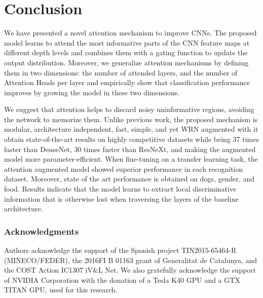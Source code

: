 \documentclass[runningheads]{llncs}
\begin{document}
\section{Conclusion}
We have presented a novel attention mechanism to improve CNNs. The proposed model learns to attend the most informative parts of the CNN feature maps at different depth levels and combines them with a gating function to update the output distribution. Moreover, we generalize attention mechanisms by defining them in two dimensions: the number of attended layers, and the number of Attention Heads per layer and empirically show that classification performance improves by growing the model in these two dimensions. 

We suggest that attention helps to discard noisy uninformative regions, avoiding the network to memorize them. Unlike previous work, the proposed mechanism is modular, architecture independent, fast, simple, and yet WRN augmented with it obtain state-of-the-art results on highly competitive datasets while being 37 times faster than DenseNet, 30 times faster than ResNeXt, and making the augmented model more parameter-efficient. When fine-tuning on a transfer learning task, the attention augmented model showed superior performance in each recognition dataset. Moreover, state of the art performance is obtained on dogs, gender, and food. Results indicate that the model learns to extract local discriminative information that is otherwise lost when traversing the layers of the baseline architecture.

\subsubsection*{Acknowledgments}

Authors acknowledge the support of the Spanish project TIN2015-65464-R (MINECO/FEDER), the 2016FI B 01163 grant of Generalitat de Catalunya, and the COST Action IC1307 iV\&L Net. We also gratefully acknowledge the support of NVIDIA Corporation with the donation of a Tesla K40 GPU and a GTX TITAN GPU, used for this research. 



\end{document}
